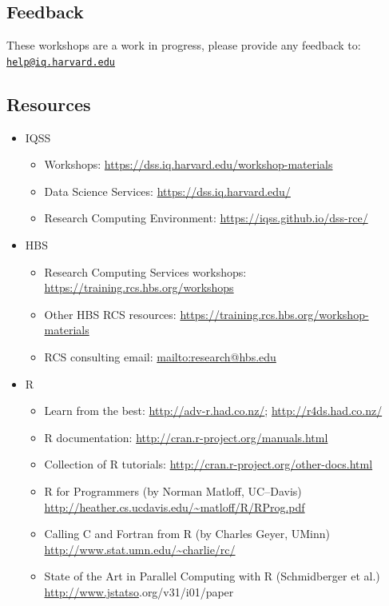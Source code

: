 \documentclass[]{book}
\providecommand{\tightlist}{%
  \setlength{\itemsep}{0pt}\setlength{\parskip}{0pt}}
\begin{document}
\hypertarget{feedback-4}{%
\subsection{Feedback}\label{feedback-4}}

These workshops are a work in progress, please provide any feedback to: \href{mailto:help@iq.harvard.edu}{\nolinkurl{help@iq.harvard.edu}}

\hypertarget{resources-4}{%
\subsection{Resources}\label{resources-4}}

\begin{itemize}
\tightlist
\item
  IQSS

  \begin{itemize}
  \tightlist
  \item
    Workshops: \url{https://dss.iq.harvard.edu/workshop-materials}
  \item
    Data Science Services: \url{https://dss.iq.harvard.edu/}
  \item
    Research Computing Environment: \url{https://iqss.github.io/dss-rce/}
  \end{itemize}
\item
  HBS

  \begin{itemize}
  \tightlist
  \item
    Research Computing Services workshops: \url{https://training.rcs.hbs.org/workshops}
  \item
    Other HBS RCS resources: \url{https://training.rcs.hbs.org/workshop-materials}
  \item
    RCS consulting email: \url{mailto:research@hbs.edu}
  \end{itemize}
\item
  R

  \begin{itemize}
  \tightlist
  \item
    Learn from the best: \url{http://adv-r.had.co.nz/}; \url{http://r4ds.had.co.nz/}
  \item
    R documentation: \url{http://cran.r-project.org/manuals.html}
  \item
    Collection of R tutorials: \url{http://cran.r-project.org/other-docs.html}
  \item
    R for Programmers (by Norman Matloff, UC--Davis) \url{http://heather.cs.ucdavis.edu/~matloff/R/RProg.pdf}
  \item
    Calling C and Fortran from R (by Charles Geyer, UMinn) \url{http://www.stat.umn.edu/~charlie/rc/}
  \item
    State of the Art in Parallel Computing with R (Schmidberger et al.) \url{http://www.jstatso}\textbar.org/v31/i01/paper
  \end{itemize}
\end{itemize}
\end{document}
